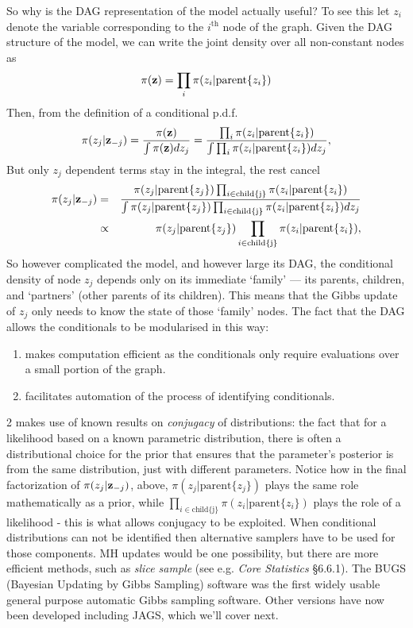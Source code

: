 \documentclass[10pt] {article}
\theoremstyle{definition}
\begin{document}
So why is the DAG representation of the model actually useful?  To see this let $z_i$ denote the variable corresponding to the $i^\text{th}$ node of the graph. Given the DAG structure of the model, we can write the joint density over all non-constant nodes as 
$$
\pi({\bf z}) = \prod_{i} \pi (z_i|\text{parent}\{z_i\})
$$
Then, from the definition of a conditional p.d.f.
$$
\pi(z_j|{\bf z}_{-j}) = \frac{\pi({\bf z})}{\int \pi({\bf z}) d z_{j}} = \frac{\prod_{i} \pi(z_i|\text{parent}\{z_i\})}{
\int \prod_{i} \pi(z_i|\text{parent}\{z_i\}) dz_j},
$$ 
But only $z_j$ dependent terms stay in the integral, the rest cancel
\begin{eqnarray*}
\pi(z_j|{\bf z}_{-j}) &=&  \frac{\pi(z_j|\text{parent}\{z_j\})\prod_{i \in \text{child\{j\}}}\pi(z_i|\text{parent}\{z_i\})}
{\int \pi(z_j|\text{parent}\{z_j\})\prod_{i \in \text{child\{j\}}}\pi(z_i|\text{parent}\{z_i\}) dz_j}\\
&\propto & \pi(z_j|\text{parent}\{z_j\})\prod_{i \in \text{child\{j\}}}\pi(z_i|\text{parent}\{z_i\}),
\end{eqnarray*}
So however complicated the model, and however large its DAG, the conditional density of node $z_j$ depends only on its immediate `family' --- its parents, children, and `partners' (other parents of its children). This means that the Gibbs update of $z_j$ only needs to know the state of those `family' nodes. The fact that the DAG allows the conditionals to be modularised in this way:
\begin{enumerate}
\item  makes computation efficient as the conditionals only require evaluations over a small portion of the graph.  
\item facilitates automation of the process of identifying conditionals.  
\end{enumerate}
2 makes use of known results on {\em conjugacy} of distributions: the fact that for a likelihood based on a known parametric distribution, there is often a distributional choice for the prior that ensures that the parameter's posterior is from the same distribution, just with different parameters. Notice how in the final factorization of $\pi(z_j|{\bf z}_{-j})$, above, $\pi(z_j|\text{parent}\{z_j\})$ plays the same role mathematically as a prior, while $\prod_{i \in \text{child\{j\}}}\pi(z_i|\text{parent}\{z_i\})$ plays the role of a likelihood - this is what allows conjugacy to be exploited. When conditional distributions can not be identified then alternative samplers have to be used for those components. MH updates would be one possibility, but there are more efficient methods, such as {\em slice sample} (see e.g. {\em Core Statistics} \S 6.6.1). The BUGS (Bayesian Updating by Gibbs Sampling) software was the first widely usable general purpose automatic Gibbs sampling software. Other versions have now been developed including JAGS, which we'll cover next.   
\end{document}
